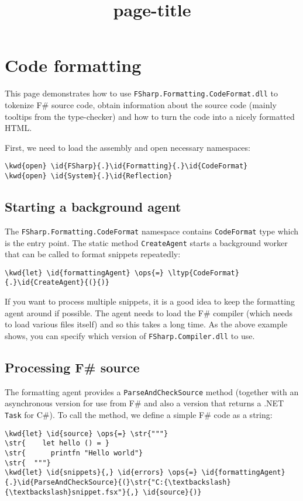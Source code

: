 \documentclass{article}
\title{{page-title}}
\date{}
\newcommand{\id}[1]{\textcolor{black}{#1}}
\newcommand{\kwd}[1]{\textcolor{navy}{#1}}
\newcommand{\ops}[1]{\textcolor{purple}{#1}}
\newcommand{\str}[1]{\textcolor{olive}{#1}}
\begin{document}
\maketitle

\section*{Code formatting}



This page demonstrates how to use \texttt{FSharp.Formatting.CodeFormat.dll} to tokenize
F\# source code, obtain information about the source code (mainly tooltips
from the type-checker) and how to turn the code into a nicely formatted HTML.


First, we need to load the assembly and open necessary namespaces:
\begin{Verbatim}[commandchars=\\\{\}]
\kwd{open} \id{FSharp}{.}\id{Formatting}{.}\id{CodeFormat}
\kwd{open} \id{System}{.}\id{Reflection}
\end{Verbatim}

\subsection*{Starting a background agent}



The \texttt{FSharp.Formatting.CodeFormat} namespace contains \texttt{CodeFormat} type which is the
entry point. The static method \texttt{CreateAgent} starts a background worker that
can be called to format snippets repeatedly:
\begin{Verbatim}[commandchars=\\\{\}]
\kwd{let} \id{formattingAgent} \ops{=} \ltyp{CodeFormat}{.}\id{CreateAgent}{(}{)}
\end{Verbatim}



If you want to process multiple snippets, it is a good idea to keep the
formatting agent around if possible. The agent needs to load the F\# compiler
(which needs to load various files itself) and so this takes a long time. As the above
example shows, you can specify which version of \texttt{FSharp.Compiler.dll} to use.
\subsection*{Processing F\# source}



The formatting agent provides a \texttt{ParseAndCheckSource} method (together with an asynchronous
version for use from F\# and also a version that returns a .NET \texttt{Task} for C\#).
To call the method, we define a simple F\# code as a string:
\begin{Verbatim}[commandchars=\\\{\}]
\kwd{let} \id{source} \ops{=} \str{"""}
\str{    let hello () = }
\str{      printfn "Hello world"}
\str{  """}
\kwd{let} \id{snippets}{,} \id{errors} \ops{=} \id{formattingAgent}{.}\id{ParseAndCheckSource}{(}\str{"C:{\textbackslash}{\textbackslash}snippet.fsx"}{,} \id{source}{)}
\end{Verbatim}
\end{document}
